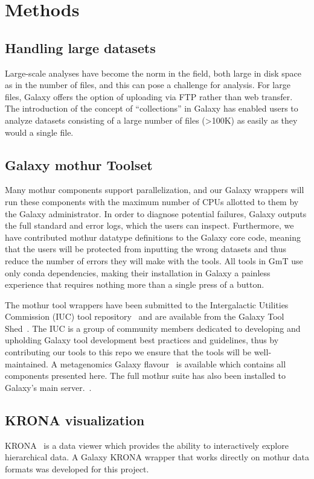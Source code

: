 \section*{Methods}

\subsection*{Handling large datasets}
Large-scale analyses have become the norm in the field, both large in disk space as in the number of files, and this can pose a challenge for analysis. For large files, Galaxy offers the option of uploading via FTP rather than web transfer. The introduction of the concept of ``collections'' in Galaxy has enabled users to analyze datasets consisting of a large number of files (>100K) as easily as they would a single file.

\subsection*{Galaxy mothur Toolset}
Many mothur components support parallelization, and our Galaxy wrappers will run these components with the maximum number of CPUs allotted to them by the Galaxy administrator. In order to diagnose potential failures, Galaxy outputs the full standard and error logs, which the users can inspect. Furthermore, we have contributed mothur datatype definitions to the Galaxy core code, meaning that the users will be protected from inputting the wrong datasets and thus reduce the number of errors they will make with the tools. All tools in GmT use only conda dependencies, making their installation in Galaxy a painless experience that requires nothing more than a single press of a button.

The mothur tool wrappers have been submitted to the Intergalactic Utilities Commission (IUC) tool repository~\cite{iuc-repo} and are available from the Galaxy Tool Shed~\cite{toolshed}. The IUC is a group of community members dedicated to developing and upholding Galaxy tool development best practices and guidelines, thus by contributing our tools to this repo we ensure that the tools will be well-maintained. A metagenomics Galaxy flavour~\cite{metagenomics-flavour} is available which contains all components presented here. The full mothur suite has also been installed to Galaxy's main server.~\cite{usegalaxy}.

\subsection*{KRONA visualization}
KRONA~\cite{ondov2011interactive} is a data viewer which provides the ability to interactively explore hierarchical data. A Galaxy KRONA wrapper that works directly on mothur data formats was developed for this project.

